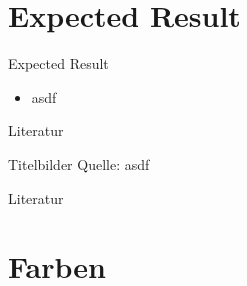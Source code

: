 \documentclass[en]{sdqbeamer}
\begin{document}
\section{Expected Result}
\begin{frame}{Expected Result}
    \begin{itemize}
        \item asdf
    \end{itemize}
\end{frame}

\appendix
\beginbackup


\begin{frame}{Literatur}
\begin{exampleblock}{Titelbilder Quelle:}
    asdf    
\end{exampleblock}
\end{frame}

\begin{frame}{Literatur}
    \printbibliography
\end{frame}

\section{Farben}
\backupend
\end{document}
